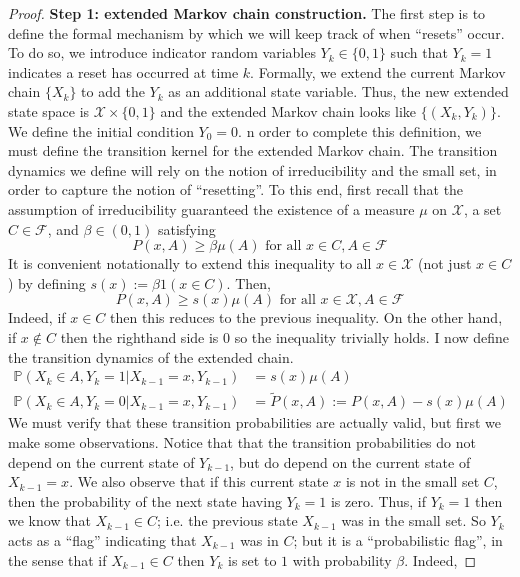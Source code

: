 \documentclass[12pt]{article}
\newcommand{\Prob}{\mathbb{P}}
\begin{document}
\begin{proof} 
\noindent
\textbf{Step 1: extended Markov chain construction.} The first step is to define the formal mechanism by which we will keep track of when ``resets'' occur. To do so, we introduce 
indicator random variables $Y_k \in \{0, 1\}$ such that $Y_k = 1$ indicates a reset has occurred at time $k$. Formally, we extend the current Markov chain $\{X_k\}$ to add the $Y_k$ as an 
additional state variable. Thus, the new extended state space is $\mathcal{X} \times \{0, 1\}$ and the extended Markov chain looks like $\{(X_k, Y_k)\}$. We define the initial condition 
$Y_0 = 0$. n order to complete this definition, we 
must define the transition kernel for the extended Markov chain. The transition dynamics we define will rely on the notion of irreducibility and the small set, in order to capture the notion of 
``resetting''. To this end, first recall that the assumption of irreducibility guaranteed the existence of a measure $\mu$ on $\mathcal{X}$, a set $C \in \mathcal{F}$, and 
$\beta \in (0, 1)$ satisfying 
\[P(x, A) \geq \beta \mu(A) \text{ for all } x \in C, A \in \mathcal{F} \]
It is convenient notationally to extend this inequality to all $x \in \mathcal{X}$ (not just $x \in C$) by defining $s(x) := \beta 1(x \in C)$. Then, 
\[P(x, A) \geq s(x)\mu(A) \text{ for all } x \in \mathcal{X}, A \in \mathcal{F} \]
Indeed, if $x \in C$ then this reduces to the previous inequality. On the other hand, if $x \notin C$ then the righthand side is $0$ so the inequality trivially holds. I now define the transition dynamics 
of the extended chain. 
\begin{align*}
\Prob(X_k \in A, Y_k = 1|X_{k-1} = x, Y_{k-1}) &= s(x)\mu(A) \\
\Prob(X_k \in A, Y_k = 0|X_{k-1} = x, Y_{k-1}) &= \tilde{P}(x, A) := P(x, A) - s(x) \mu(A) 
\end{align*} 
We must verify that these transition probabilities are actually valid, but first we make some observations. Notice that that the transition probabilities do not depend on the current 
state of $Y_{k-1}$, but do depend on the current state of $X_{k-1} = x$. We also observe that if this current state $x$ is not in the small set $C$, then the probability of the next state having 
$Y_{k} = 1$ is zero. Thus, if $Y_{k} = 1$ then we know that $X_{k-1} \in C$; i.e. the previous state $X_{k-1}$ was in the small set. So $Y_{k}$ acts as a ``flag'' indicating that 
$X_{k-1}$ was in $C$; but it is a ``probabilistic flag'', in the sense that if $X_{k-1} \in C$ then $Y_k$ is set to $1$ with probability $\beta$. Indeed, 

\end{proof}
\end{document}
